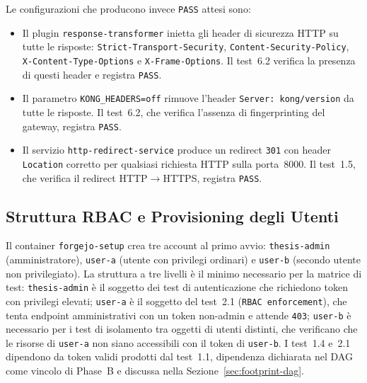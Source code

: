 Le configurazioni che producono invece \texttt{PASS} attesi sono:

\begin{itemize}

      \item Il plugin \texttt{response-transformer} inietta gli header di
            sicurezza \gls{HTTP} su tutte le risposte: \texttt{Strict-Transport-Security},
            \texttt{Content-Security-Policy}, \texttt{X-Content-Type-Options} e
            \texttt{X-Frame-Options}. Il test~6.2 verifica la presenza di questi header e registra \texttt{PASS}.

      \item Il parametro \texttt{KONG\_HEADERS=off} rimuove l'header
            \texttt{Server: kong/version} da tutte le risposte. Il test~6.2,
            che verifica l'assenza di fingerprinting del gateway, registra
            \texttt{PASS}.

      \item Il servizio \texttt{http-redirect-service} produce un redirect
            \texttt{301} con header \texttt{Location} corretto per qualsiasi
            richiesta \gls{HTTP} sulla porta~8000. Il test~1.5, che verifica il
            redirect \gls{HTTP}$\to$\gls{HTTPS}, registra \texttt{PASS}.

\end{itemize}


\subsection{Struttura RBAC e Provisioning degli Utenti}\label{subsec:struttura-rbac}

Il container \texttt{forgejo-setup} crea tre account al primo avvio: \texttt{thesis-admin} (amministratore), \texttt{user-a} (utente con privilegi ordinari) e \texttt{user-b} (secondo utente non privilegiato). La struttura a tre livelli è il minimo necessario per la matrice di test: \texttt{thesis-admin} è il soggetto dei test di autenticazione che richiedono token con privilegi elevati; \texttt{user-a} è il soggetto del test~2.1 (\texttt{RBAC enforcement}), che tenta endpoint amministrativi con un token non-admin e attende \texttt{403}; \texttt{user-b} è necessario per i test di isolamento tra oggetti di utenti distinti, che verificano che le risorse di \texttt{user-a} non siano accessibili con il token di \texttt{user-b}. I test~1.4 e~2.1 dipendono da token validi prodotti dal test~1.1, dipendenza dichiarata nel \gls{DAG} come vincolo di Phase~B e discussa nella Sezione~\ref{sec:footprint-dag}.

